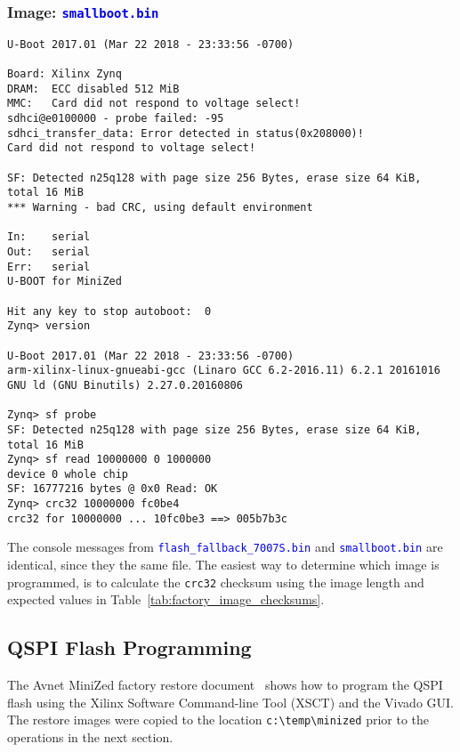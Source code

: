 \subsubsection*{Image: \textcolor{blue}{\texttt{smallboot.bin}}}
%
\begin{verbatim}
U-Boot 2017.01 (Mar 22 2018 - 23:33:56 -0700)

Board: Xilinx Zynq
DRAM:  ECC disabled 512 MiB
MMC:   Card did not respond to voltage select!
sdhci@e0100000 - probe failed: -95
sdhci_transfer_data: Error detected in status(0x208000)!
Card did not respond to voltage select!

SF: Detected n25q128 with page size 256 Bytes, erase size 64 KiB, total 16 MiB
*** Warning - bad CRC, using default environment

In:    serial
Out:   serial
Err:   serial
U-BOOT for MiniZed

Hit any key to stop autoboot:  0
Zynq> version

U-Boot 2017.01 (Mar 22 2018 - 23:33:56 -0700)
arm-xilinx-linux-gnueabi-gcc (Linaro GCC 6.2-2016.11) 6.2.1 20161016
GNU ld (GNU Binutils) 2.27.0.20160806

Zynq> sf probe
SF: Detected n25q128 with page size 256 Bytes, erase size 64 KiB, total 16 MiB
Zynq> sf read 10000000 0 1000000
device 0 whole chip
SF: 16777216 bytes @ 0x0 Read: OK
Zynq> crc32 10000000 fc0be4
crc32 for 10000000 ... 10fc0be3 ==> 005b7b3c
\end{verbatim}
%
The console messages from \textcolor{blue}{\texttt{flash\_fallback\_7007S.bin}}
and \textcolor{blue}{\texttt{smallboot.bin}} are identical, since they the same 
file. The easiest way to determine which image is programmed, is
to calculate the \verb+crc32+ checksum using the image length and
expected values in Table~\ref{tab:factory_image_checksums}.

\clearpage
\subsection{QSPI Flash Programming}
\label{sec:qspi_flash_programming}

The Avnet MiniZed factory restore document~\cite{Avnet_MiniZed_Restore_2018}
shows how to program the QSPI flash using the Xilinx Software Command-line
Tool (XSCT) and the Vivado GUI. The restore images were copied to the
location \verb+c:\temp\minized+ prior to the operations in the next section.

